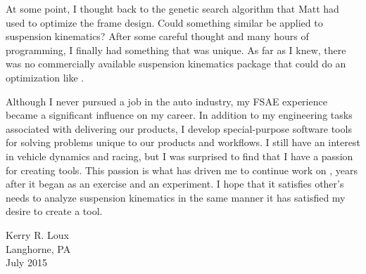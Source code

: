 At some point, I thought back to the genetic search algorithm that Matt had used to optimize the frame design.  Could something similar be applied to suspension kinematics?  After some careful thought and many hours of programming, I finally had something that was unique.  As far as I knew, there was no commercially available suspension kinematics package that could do an optimization like \vvase{}.

Although I never pursued a job in the auto industry, my FSAE experience became a significant influence on my career.  In addition to my engineering tasks associated with delivering our products, I develop special-purpose software tools for solving problems unique to our products and workflows.  I still have an interest in vehicle dynamics and racing, but I was surprised to find that I have a passion for creating tools.  This passion is what has driven me to continue work on \vvase{}, years after it began as an exercise and an experiment.  I hope that it satisfies other's needs to analyze suspension kinematics in the same manner it has satisfied my desire to create a tool.




\begin{flushright}
Kerry R. Loux \\
Langhorne, PA \\
July 2015
\end{flushright}
